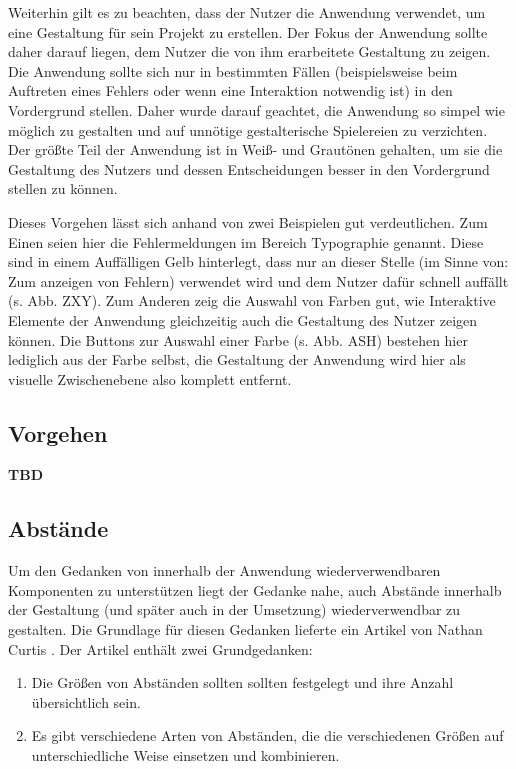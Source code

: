 Weiterhin gilt es zu beachten, dass der Nutzer die Anwendung verwendet, um eine Gestaltung für sein Projekt zu erstellen. Der Fokus der Anwendung sollte daher darauf liegen, dem Nutzer die von ihm erarbeitete Gestaltung zu zeigen. Die Anwendung sollte sich nur in bestimmten Fällen (beispielsweise beim Auftreten eines Fehlers oder wenn eine Interaktion notwendig ist) in den Vordergrund stellen. Daher wurde darauf geachtet, die Anwendung so simpel wie möglich zu gestalten und auf unnötige gestalterische Spielereien zu verzichten. Der größte Teil der Anwendung ist in Weiß- und Grautönen gehalten, um sie die Gestaltung des Nutzers und dessen Entscheidungen besser in den Vordergrund stellen zu können.

Dieses Vorgehen lässt sich anhand von zwei Beispielen gut verdeutlichen. Zum Einen seien hier die Fehlermeldungen im Bereich Typographie genannt. Diese sind in einem Auffälligen Gelb hinterlegt, dass nur an dieser Stelle (im Sinne von: Zum anzeigen von Fehlern) verwendet wird und dem Nutzer dafür schnell auffällt (s. Abb. ZXY).
Zum Anderen zeig die Auswahl von Farben gut, wie Interaktive Elemente der Anwendung gleichzeitig auch die Gestaltung des Nutzer zeigen können. Die Buttons zur Auswahl einer Farbe (s. Abb. ASH) bestehen hier lediglich aus der Farbe selbst, die Gestaltung der Anwendung wird hier als visuelle Zwischenebene also komplett entfernt.

\subsection{Vorgehen}
\textbf{TBD}

\subsection{Abstände}
Um den Gedanken von innerhalb der Anwendung wiederverwendbaren Komponenten zu unterstützen liegt der Gedanke nahe, auch Abstände innerhalb der Gestaltung (und später auch in der Umsetzung) wiederverwendbar zu gestalten. Die Grundlage für diesen Gedanken lieferte ein Artikel von Nathan Curtis \cite{CurtisSpace16}. Der Artikel enthält zwei Grundgedanken:

\begin{enumerate}
  \item Die Größen von Abständen sollten sollten festgelegt und ihre Anzahl übersichtlich sein.
  \item Es gibt verschiedene Arten von Abständen, die die verschiedenen Größen auf unterschiedliche Weise einsetzen und kombinieren.
\end{enumerate}


